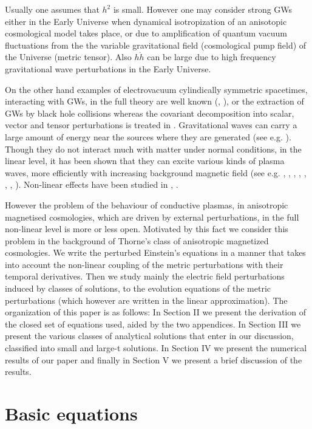 \documentclass[prd,twocolumn,showpacs,preprintnumbers,amsmath,amssy mb]{revtex4}
\begin{document}
Usually one assumes that $h^{2}$ is small. However one may 
consider strong GWs either in the Early Universe when 
dynamical isotropization of an anisotopic cosmological model 
takes place, or due to amplification of quantum vacuum fluctuations 
from the the variable gravitational field (cosmological pump field) 
of the Universe (metric tensor). Also $h\dot{h}$ can be large 
due to high frequency gravitational wave perturbations in 
the Early Universe. 

On the other hand examples of electrovacuum cylindically symmetric 
spacetimes, interacting with GWs, in the full theory are well 
known (\cite{pap4}, \cite{pap5}), or the extraction of GWs 
by black hole collisions \cite{abra} whereas the covariant 
decomposition into scalar, vector and tensor perturbations is 
treated in \cite{mukh}. Gravitational waves can carry a large 
amount of energy near the sources where they are generated 
(see e.g. \cite{kokk}). Though they do not interact much with 
matter under normal conditions, in the linear level, it has 
been shown that they can excite various kinds of plasma waves, 
more efficiently with increasing background magnetic field 
(see e.g. \cite{pap3}, \cite{brod1}, \cite{brod2}, 
\cite{serv1}, \cite{serv2}, \cite{moor1}, \cite{moor2}, 
\cite{kall}). Non-linear effects have been studied in 
\cite{brod1}, \cite{kall}.

However the problem of the behaviour of conductive plasmas, in 
anisotropic magnetised cosmologies, which are driven by external 
perturbations, in the full non-linear level is more or less 
open. Motivated by this fact we consider this problem in the 
background of Thorne's class of anisotropic magnetized cosmologies. 
We write the perturbed Einstein's equations in a manner that 
takes into account the non-linear coupling of the metric perturbations 
with their temporal derivatives. Then we study mainly the electric 
field perturbations induced by classes of solutions, to the 
evolution equations of the metric perturbations (which however 
are written in the linear approximation). The organization of 
this paper is as follows: In Section II we present the derivation 
of the closed set of equations used, aided by the two 
appendices. In Section III we present the various classes of 
analytical solutions that enter in our discussion, classified 
into small and large-t solutions. In Section IV we present 
the numerical results of our paper and finally in Section 
V we present a brief discussion of the results. 


\section{Basic equations}
\end{document}

